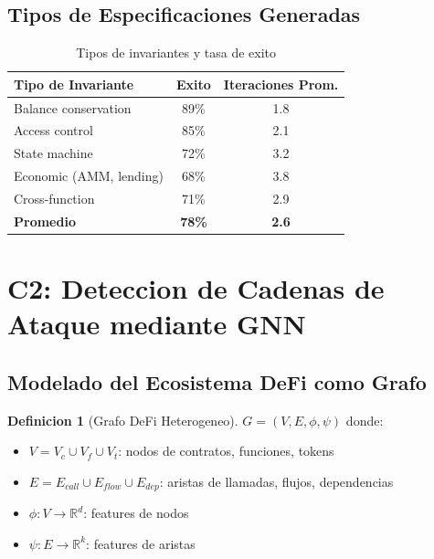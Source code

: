 \documentclass[11pt]{article}
\theoremstyle{definition}
\newtheorem{definicion}{Definicion}[section]
\theoremstyle{plain}
\theoremstyle{remark}
\begin{document}
\subsection{Tipos de Especificaciones Generadas}

\begin{table}[H]
\centering
\caption{Tipos de invariantes y tasa de exito}
\label{tab:invariant_types}
\begin{tabular}{lcc}
\toprule
\textbf{Tipo de Invariante} & \textbf{Exito} & \textbf{Iteraciones Prom.} \\
\midrule
Balance conservation & 89\% & 1.8 \\
Access control & 85\% & 2.1 \\
State machine & 72\% & 3.2 \\
Economic (AMM, lending) & 68\% & 3.8 \\
Cross-function & 71\% & 2.9 \\
\midrule
\textbf{Promedio} & \textbf{78\%} & \textbf{2.6} \\
\bottomrule
\end{tabular}
\end{table}

\section{C2: Deteccion de Cadenas de Ataque mediante GNN}
\label{sec:gnn}

\subsection{Modelado del Ecosistema DeFi como Grafo}

\begin{definicion}[Grafo DeFi Heterogeneo]
$G = (V, E, \phi, \psi)$ donde:
\begin{itemize}
    \item $V = V_c \cup V_f \cup V_t$: nodos de contratos, funciones, tokens
    \item $E = E_{call} \cup E_{flow} \cup E_{dep}$: aristas de llamadas, flujos, dependencias
    \item $\phi: V \rightarrow \mathbb{R}^d$: features de nodos
    \item $\psi: E \rightarrow \mathbb{R}^k$: features de aristas
\end{itemize}
\end{definicion}
\end{document}
